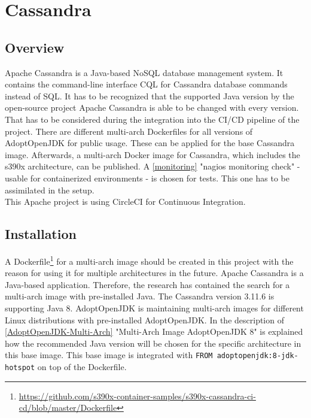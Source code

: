 \chapter{Cassandra}\label{ch:cassandra}

\section{Overview}

Apache Cassandra is a Java-based NoSQL database management system. It contains the command-line interface CQL for Cassandra database commands instead of SQL. It has to be recognized that the supported Java version by the open-source project Apache Cassandra is able to be changed with every version. 
That has to be considered during the integration into the \gls{CI/CD} pipeline of the project. There are different multi-arch Dockerfiles for all versions of AdoptOpenJDK for public usage. These can be applied for the base Cassandra image. Afterwards, a multi-arch Docker image for Cassandra, which includes the s390x architecture, can be published. 
A \ref{monitoring} "nagios monitoring check" - usable for containerized environments - is chosen for tests. This one has to be assimilated in the setup. \\ 
This Apache project is using CircleCI for Continuous Integration. 

\section{Installation}\label{Cassandra-Installation}

A Dockerfile\footnote{\url{https://github.com/s390x-container-samples/s390x-cassandra-ci-cd/blob/master/Dockerfile}} for a multi-arch image should be created in this project with the reason for using it for multiple architectures in the future.
Apache Cassandra is a Java-based application. Therefore, the research has contained the search for a multi-arch image with pre-installed Java. The Cassandra version 3.11.6 is supporting Java 8. 
AdoptOpenJDK is maintaining multi-arch images for different Linux distributions with pre-installed AdoptOpenJDK.
In the description of \ref{AdoptOpenJDK-Multi-Arch} "Multi-Arch Image AdoptOpenJDK 8" is explained how the recommended Java version will be chosen for the specific architecture in this base image. 
This base image is integrated with \lstinline!FROM adoptopenjdk:8-jdk-hotspot! on top of the Dockerfile.

